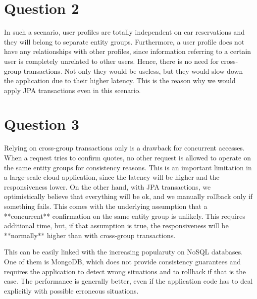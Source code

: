 \documentclass[a4paper,10pt]{article}
\begin{document}
\section{Question 2}
In such a scenario, user profiles are totally independent on car reservations and they will belong to separate entity groups. Furthermore, a user profile does not have any relationships with other profiles, since information referring to a certain user is completely unrelated to other users. Hence, there is no need for cross-group transactions. Not only they would be useless, but they would slow down the application due to their higher latency. This is the reason why we would apply JPA transactions even in this scenario.

\section{Question 3}
Relying on cross-group transactions only is a drawback for concurrent accesses. When a request tries to confirm quotes, no other request is allowed to operate on the same entity groups for consistency reasons. This is an important limitation in a large-scale cloud application, since the latency will be higher and the responsiveness lower. On the other hand, with JPA transactions, we optimistically believe that everything will be ok, and we manually rollback only if something fails. This comes with the underlying assumption that a **concurrent** confirmation on the same entity group is unlikely. This requires additional time, but, if that assumption is true, the responsiveness will be **normally** higher than with cross-group transactions. 

This can be easily linked with the increasing popularuty on NoSQL databases. One of them is MongoDB, which does not provide consistency guarantees and requires the application to detect wrong situations and to rollback if that is the case. The performance is generally better, even if the application code has to deal explicitly with possible erroneous situations.
\end{document}
